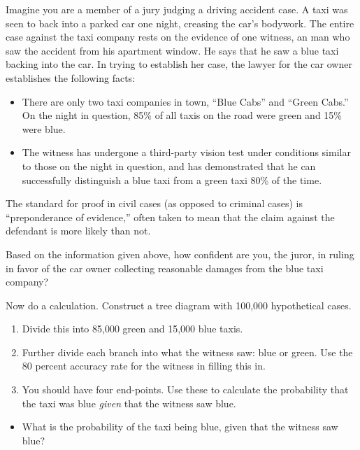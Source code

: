 Imagine you are a member of a jury judging a driving accident
case.  A taxi was seen to back into a parked car one night, creasing
the car's bodywork. The
entire case against the taxi company rests on the evidence of one
witness, an man who saw the accident from his apartment window.
He says that he saw a blue 
taxi backing into the car.  In trying to establish her case, the
lawyer for the 
car owner establishes the following facts:
\begin{itemize}
\item There are only two taxi companies in town, ``Blue Cabs'' and
  ``Green Cabs.''  On the night in question, 85\% of all taxis on the
  road were green and 15\% were blue.
\item The witness has undergone a third-party vision test under
  conditions similar to those on the night in question, and has
  demonstrated that he can successfully distinguish a blue taxi from a
  green taxi 80\% of the time.
\end{itemize}

The standard for proof in civil cases (as opposed to criminal cases)
is ``preponderance of evidence,'' often taken to mean that the claim
against the defendant is more likely than not.

Based on the information given above, how confident are you, the
juror, in ruling in favor of the car owner collecting reasonable
damages from the blue taxi company?

\begin{MultipleChoice}[itemname=before]
\end{MultipleChoice}


Now do a calculation.   Construct a tree diagram with 100,000
hypothetical cases. 
\begin{enumerate}
\item  Divide this into 85,000 green and 15,000 blue
taxis.  
\item Further divide each branch into what the witness saw:
blue or green.  Use the 80 percent accuracy rate for the witness in
filling this in. 
\item You should have four end-points.  Use these to calculate the
  probability that the taxi was blue {\em given} that the witness saw
  blue.
\end{enumerate}

\begin{itemize}
\item What is the probability of the taxi being blue, given that the
witness saw blue?
\end{itemize}

